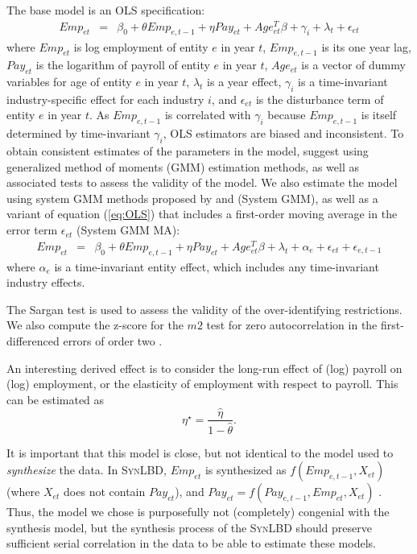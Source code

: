\documentclass[10pt,twoside]{article}
\newcommand{\SynLBD}{\textsc{SynLBD}}
\begin{document}
The base model is an OLS specification:
\begin{eqnarray}	
\label{eq:OLS}
Emp_{et} & = & \beta_0 + \theta Emp_{e,t-1} + \eta Pay_{et} + Age_{et}^{T}\beta + \gamma_i + \lambda_t + \epsilon_{et}
\end{eqnarray}
where $Emp_{et}$ is log employment of entity $e$ in year $t$, $Emp_{e,t-1}$ is its one year lag, $Pay_{et}$ is the logarithm of payroll of entity $e$ in year $t$, $Age_{et}$ is a vector of dummy variables for age of entity $e$ in year $t$, $\lambda_t$ is a year  effect, $\gamma_i$ is a time-invariant industry-specific effect for each industry $i$, and $\epsilon_{et}$ is the disturbance term of entity $e$ in year $t$. 
As $Emp_{e,t-1}$ is correlated with $\gamma_{i}$ because $Emp_{e,t-1}$ is itself determined by time-invariant $\gamma_{i}$, OLS estimators are biased and inconsistent. To obtain consistent estimates of the parameters in the model, \textcite{RePEc:oup:restud:v:58:y:1991:i:2:p:277-297.} suggest using  generalized method of moments (GMM) estimation methods, as well as associated tests to assess the  validity of the model.  
We also estimate the model using system GMM methods proposed by \textcite{RePEc:eee:econom:v:68:y:1995:i:1:p:29-51} and \textcite{RePEc:eee:econom:v:87:y:1998:i:1:p:115-143} (System GMM), as well as a variant of equation (\ref{eq:OLS}) that includes a first-order moving average in the error term $\epsilon_{et}$ (System GMM MA):
\begin{eqnarray}	
Emp_{et}&=&\beta_{0} +\theta Emp_{e,t-1}+\eta Pay_{et} + Age_{et}^{T}\beta + \lambda_t +\alpha_e   + \epsilon_{et} + \epsilon_{e,t-1}
\end{eqnarray}
where $\alpha_e$ is a time-invariant entity effect, which includes any time-invariant industry effects.

The Sargan test \parencite{hansen_large_1982,RePEc:oup:restud:v:58:y:1991:i:2:p:277-297.,blundell_estimation_2001} is used to assess the validity of the over-identifying restrictions. We also compute the z-score for the $m2$ test for zero autocorrelation in the  first-differenced errors of order two \parencite{RePEc:oup:restud:v:58:y:1991:i:2:p:277-297.}. 

An interesting derived effect is to consider the long-run effect of (log) payroll on (log) employment, or the elasticity of employment with respect to payroll. This can be estimated as
$$
\eta^\star = \frac{\hat{\eta}}{1-\hat{\theta}}.
$$

It is important that this model is close, but not identical to the model used to \textit{synthesize} the data. In \SynLBD, $Emp_{et}$ is synthesized as $f(Emp_{e,t-1},X_{et})$ (where $X_{et}$ does not contain $Pay_{et}$), and $Pay_{et} = f(Pay_{e,t-1},Emp_{et},X_{et})$ \citep[pg. 366]{KinneyEtAl2011}. Thus, the model we chose is purposefully not (completely) congenial with the synthesis model, but the synthesis process of the \SynLBD{} should preserve sufficient serial correlation in the data to be able to estimate these models.
\end{document}
